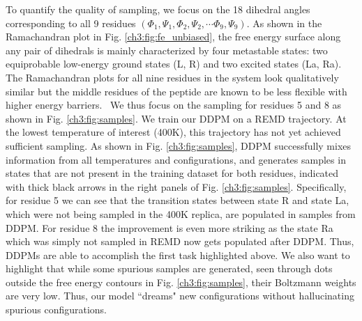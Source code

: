 

 To quantify the quality of sampling, we focus on the 18 dihedral angles corresponding to all 9 residues $(\Phi_1, \Psi_1, \Phi_2, \Psi_2, \cdots \Phi_9, \Psi_9)$. As shown in the Ramachandran plot in Fig. \ref{ch3:fig:fe_unbiased}, the free energy surface along any pair of dihedrals is mainly characterized by four metastable states: two equiprobable low-energy ground states (L, R) and two excited states (La, Ra). The Ramachandran plots for all nine residues in the system look qualitatively similar but the middle residues of the peptide are known to be less flexible with higher energy barriers.~\cite{biswas2018metadynamics, SPIB_AIB9} We thus focus on the sampling for residues 5 and 8 as shown in Fig. \ref{ch3:fig:samples}. We train our DDPM on a REMD trajectory. At the lowest temperature of interest (400K), this trajectory has not yet achieved sufficient sampling. As shown in Fig. \ref{ch3:fig:samples}, DDPM successfully mixes information from all temperatures and configurations, and generates samples in states that are not present in the training dataset for both residues, indicated with thick black arrows in the right panels of Fig. \ref{ch3:fig:samples}. Specifically, for residue 5 we can see that the transition states between state R and state La, which were not being sampled in the 400K replica, are populated in samples from DDPM. For residue 8 the improvement is even more striking as the state Ra which was simply not sampled in REMD now gets populated after DDPM. Thus, DDPMs are able to accomplish the first task highlighted above. We also want to highlight that while some spurious samples are generated, seen through dots outside the free energy contours in Fig. \ref{ch3:fig:samples}, their Boltzmann weights are very low. Thus, our model ``dreams" new configurations without hallucinating spurious configurations.
 
